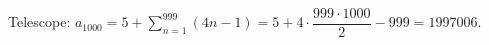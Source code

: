 Telescope: $a_{1000}=5+\sum_{n=1}^{999}(4n-1)=5+4\cdot\dfrac{999\cdot1000}{2}-999=\boxed{1997006}$.

